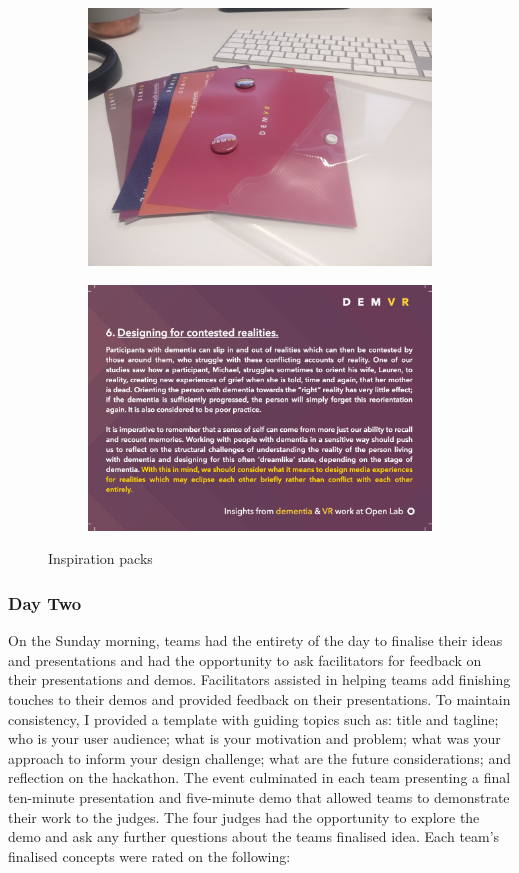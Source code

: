 \begin{figure}
\centering
\begin{subfigure}{.5\textwidth}
  \centering
  \includegraphics[width=.8\linewidth]{Images/DemVR/DemVRInspiration.jpeg}
  \label{fig:InspirationPackImage}
\end{subfigure}%
\begin{subfigure}{.5\textwidth}
  \centering
  \includegraphics[width=.8\linewidth]{Images/DemVR/InspirationCard.png}
  \label{fig:InspirationCard}
\end{subfigure}
\caption{Inspiration packs}
\label{fig:InspirationPacks}
\end{figure}

\subsubsection{Day Two}
\label{DayTwo}
On the Sunday morning, teams had the entirety of the day to finalise their ideas and presentations and had the opportunity to ask facilitators for feedback on their presentations and demos. Facilitators assisted in helping teams add finishing touches to their demos and provided feedback on their presentations. To maintain consistency, I provided a template with guiding topics such as: title and tagline; who is your user audience; what is your motivation and problem; what was your approach to inform your design challenge; what are the future considerations; and reflection on the hackathon. The event culminated in each team presenting a final ten-minute presentation and five-minute demo that allowed teams to demonstrate their work to the judges. The four judges had the opportunity to explore the demo and ask any further questions about the teams finalised idea. Each team’s finalised concepts were rated on the following:

